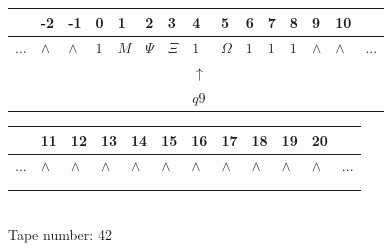 \documentclass[11pt]{article}
\begin{document}
\begin{table}[H]
\centering
\begin{tabular}{lllllllllllllll}
 & -2 & -1 & 0 & 1 & 2 & 3 & 4 & 5 & 6 & 7 & 8 & 9 & 10 & \\
\hline
$...$ & \multicolumn{1}{|l|}{$\wedge$} & \multicolumn{1}{|l|}{$\wedge$} & \multicolumn{1}{|l|}{$1$} & \multicolumn{1}{|l|}{$M$} & \multicolumn{1}{|l|}{$\Psi$} & \multicolumn{1}{|l|}{$\Xi$} & \multicolumn{1}{|l|}{$1$} & \multicolumn{1}{|l|}{$\Omega$} & \multicolumn{1}{|l|}{$1$} & \multicolumn{1}{|l|}{$1$} & \multicolumn{1}{|l|}{$1$} & \multicolumn{1}{|l|}{$\wedge$} & \multicolumn{1}{|l|}{$\wedge$} & $...$\\
\hline
&  &  &  &  &  &  & $\uparrow$ &  &  &  &  &  &  &  \\
&  &  &  &  &  &  & $ q9 $ &  &  &  &  &  &  &  \\
\end{tabular}
\begin{tabular}{llllllllllll}
 & 11 & 12 & 13 & 14 & 15 & 16 & 17 & 18 & 19 & 20 & \\
\hline
$...$ & \multicolumn{1}{|l|}{$\wedge$} & \multicolumn{1}{|l|}{$\wedge$} & \multicolumn{1}{|l|}{$\wedge$} & \multicolumn{1}{|l|}{$\wedge$} & \multicolumn{1}{|l|}{$\wedge$} & \multicolumn{1}{|l|}{$\wedge$} & \multicolumn{1}{|l|}{$\wedge$} & \multicolumn{1}{|l|}{$\wedge$} & \multicolumn{1}{|l|}{$\wedge$} & \multicolumn{1}{|l|}{$\wedge$} & $...$\\
\hline
&  &  &  &  &  &  &  &  &  &  &  \\
&  &  &  &  &  &  &  &  &  &  &  \\
\end{tabular}
\\
Tape number: 42
\noindent\makebox[\linewidth]{\hdashrule{\textwidth}{1pt}{1pt}}\end{table}
\end{document}
